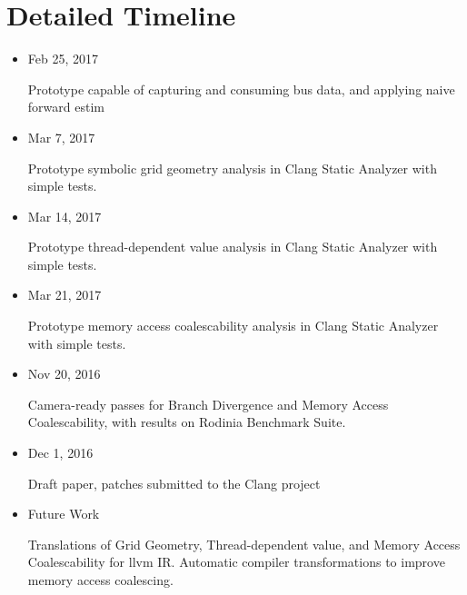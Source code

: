 \documentclass{article}
\begin{document}
\section{Detailed Timeline}

    \begin{itemize}
        \item Feb 25, 2017

        Prototype capable of capturing and consuming bus data, and applying naive forward estim

        \item Mar 7, 2017

        Prototype symbolic grid geometry analysis in Clang Static Analyzer with simple tests.

        \item Mar 14, 2017

        Prototype thread-dependent value analysis in Clang Static Analyzer with simple tests.

        \item Mar 21, 2017

        Prototype memory access coalescability analysis in Clang Static Analyzer with simple tests.

        \item Nov 20, 2016

        Camera-ready passes for Branch Divergence and Memory Access Coalescability, with results on Rodinia Benchmark Suite.

        \item Dec 1, 2016

        Draft paper, patches submitted to the Clang project


        \item Future Work

        Translations of Grid Geometry, Thread-dependent value, and Memory Access Coalescability for llvm IR.
        Automatic compiler transformations to improve memory access coalescing.


    \end{itemize}



\end{document}
